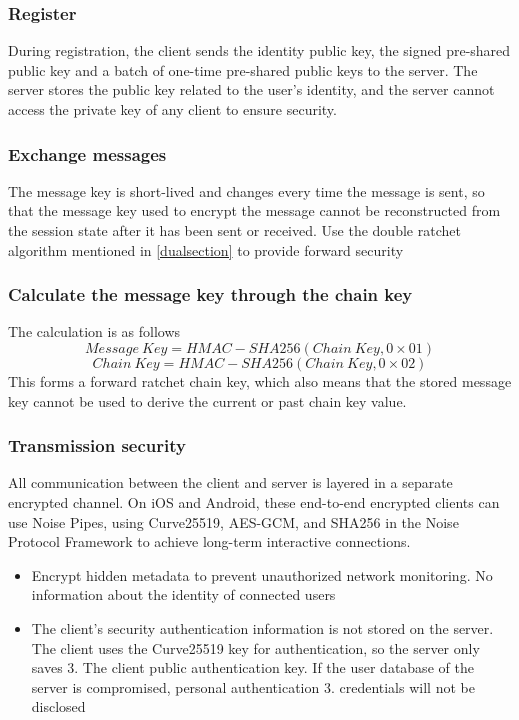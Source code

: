 \documentclass[11pt]{article}
\begin{document}
\subsubsection{Register}
\label{section:register}

During registration, the client sends the identity public key, the signed pre-shared public key and a batch of one-time pre-shared public keys to the server. 
The server stores the public key related to the user's identity, and the server cannot access the private key of any client to ensure security.

\subsubsection{Exchange messages}
\label{section:em}
The message key is short-lived and changes every time the message is sent, so that the message key used to encrypt the message cannot be reconstructed from the session state after it has been sent or received.
Use the double ratchet algorithm mentioned in \ref{dualsection} to provide forward security

\subsubsection{Calculate the message key through the chain key}
\label{section:cm}
The calculation is as follows
\begin{equation}
    Message \ Key = HMAC-SHA256(Chain\ Key, 0\times 01)
\end{equation}
\begin{equation}
    Chain \ Key = HMAC-SHA256(Chain\ Key, 0\times 02)
\end{equation}
This forms a forward ratchet chain key, which also means that the stored message key cannot be used to derive the current or past chain key value.

\subsubsection{Transmission security}
All communication between the client and server is layered in a separate encrypted channel. 
On iOS and Android, these end-to-end encrypted clients can use Noise Pipes, using Curve25519, AES-GCM, and SHA256 in the Noise Protocol Framework to achieve long-term interactive connections.
\begin{itemize}
    \item Encrypt hidden metadata to prevent unauthorized network monitoring. 
    No information about the identity of connected users
    \item The client's security authentication information is not stored on the server. 
    The client uses the Curve25519 key for authentication, so the server only saves 3. The client public authentication key. 
    If the user database of the server is compromised, personal authentication 3. credentials will not be disclosed
\end{itemize}
\end{document}
